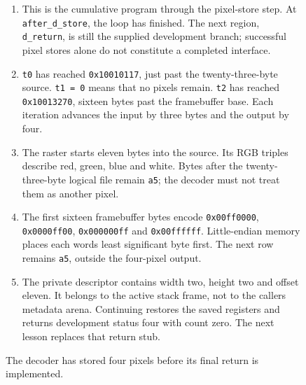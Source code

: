 \begin{figure}[htbp]
\begin{minipage}{\linewidth}
\begin{enumerate}
      \item This is the cumulative program through the pixel-store step. At \texttt{after\_d\_store}, the loop has finished. The next region, \texttt{d\_return}, is still the supplied development branch; successful pixel stores alone do not constitute a completed interface.
      \item \texttt{t0} has reached \texttt{0x10010117}, just past the twenty-three-byte source. \texttt{t1 = 0} means that no pixels remain. \texttt{t2} has reached \texttt{0x10013270}, sixteen bytes past the framebuffer base. Each iteration advances the input by three bytes and the output by four.
      \item The raster starts eleven bytes into the source. Its RGB triples describe red, green, blue and white. Bytes after the twenty-three-byte logical file remain \texttt{a5}; the decoder must not treat them as another pixel.
      \item The first sixteen framebuffer bytes encode \texttt{0x00ff0000}, \texttt{0x0000ff00}, \texttt{0x000000ff} and \texttt{0x00ffffff}. Little-endian memory places each word\textquotesingle s least significant byte first. The next row remains \texttt{a5}, outside the four-pixel output.
      \item The private descriptor contains width two, height two and offset eleven. It belongs to the active stack frame, not to the caller\textquotesingle s metadata arena. Continuing restores the saved registers and returns development status four with count zero. The next lesson replaces that return stub.
    \end{enumerate}
  \end{minipage}
  \caption{The decoder has stored four pixels before its final return is implemented.}
  \label{capture:029-binary-ppm-f02}
  \label{ppm-f02}
\end{figure}
\par
